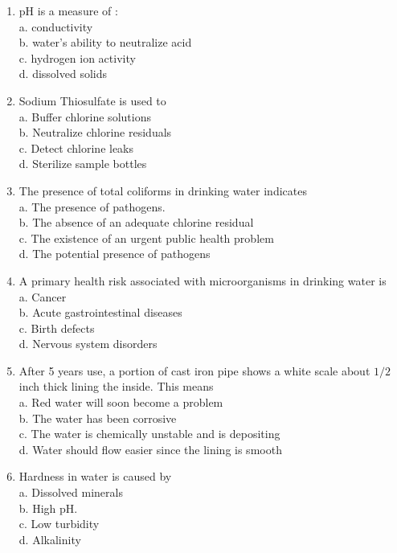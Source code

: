 \begin{enumerate}[1.]
\item $\mathrm{pH}$ is a measure of :\\
a. conductivity\\
b. water's ability to neutralize acid\\
c. hydrogen ion activity\\
d. dissolved solids\\
\item  Sodium Thiosulfate is used to\\
a. Buffer chlorine solutions\\
b. Neutralize chlorine residuals\\
c. Detect chlorine leaks\\
d. Sterilize sample bottles\\
  \item The presence of total coliforms in drinking water indicates\\
a. The presence of pathogens.\\
b. The absence of an adequate chlorine residual\\
c. The existence of an urgent public health problem\\
d. The potential presence of pathogens\\
\item A primary health risk associated with microorganisms in drinking water is\\
a. Cancer\\
b. Acute gastrointestinal diseases\\
c. Birth defects\\
d. Nervous system disorders\\
  \item After 5 years use, a portion of cast iron pipe shows a white scale about $1 / 2$ inch thick lining the inside. This means\\
a. Red water will soon become a problem\\
b. The water has been corrosive\\
c. The water is chemically unstable and is depositing\\
d. Water should flow easier since the lining is smooth\\
  \item Hardness in water is caused by\\
a. Dissolved minerals\\
b. High $\mathrm{pH}$.\\
c. Low turbidity\\
d. Alkalinity\\

\end{enumerate}
